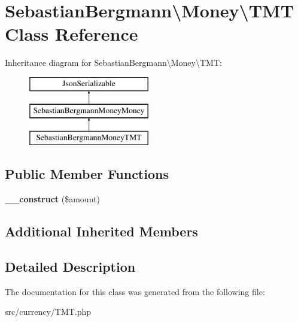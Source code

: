 \hypertarget{classSebastianBergmann_1_1Money_1_1TMT}{}\section{Sebastian\+Bergmann\textbackslash{}Money\textbackslash{}T\+M\+T Class Reference}
\label{classSebastianBergmann_1_1Money_1_1TMT}
Inheritance diagram for Sebastian\+Bergmann\textbackslash{}Money\textbackslash{}T\+M\+T\+:\begin{figure}[H]
\begin{center}
\leavevmode
\includegraphics[height=3.000000cm]{classSebastianBergmann_1_1Money_1_1TMT}
\end{center}
\end{figure}
\subsection*{Public Member Functions}
\begin{DoxyCompactItemize}
\item 
\hypertarget{classSebastianBergmann_1_1Money_1_1TMT_a81f3353cecb9bb3cc7a9123597917c57}{}{\bfseries \+\_\+\+\_\+construct} (\$amount)\label{classSebastianBergmann_1_1Money_1_1TMT_a81f3353cecb9bb3cc7a9123597917c57}

\end{DoxyCompactItemize}
\subsection*{Additional Inherited Members}


\subsection{Detailed Description}


The documentation for this class was generated from the following file\+:\begin{DoxyCompactItemize}
\item 
src/currency/T\+M\+T.\+php\end{DoxyCompactItemize}
